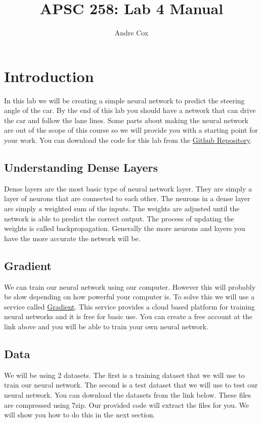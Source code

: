 \documentclass[11pt]{report}
\title{APSC 258: Lab 4 Manual}
\author{Andre Cox}
\begin{document}
\maketitle
\tableofcontents

\clearpage

\chapter{Introduction}
In this lab we will be creating a simple neural network to predict the steering angle of the car.
By the end of this lab you should have a network that can drive the car and follow the lane lines. Some parts about making the neural network are out of the scope of this course so we will provide you with a starting point for your work. You can download the code for this lab from the  
\href{https://github.com/PiCarV/Demos}{Github Repository}.

\section{Understanding Dense Layers}
Dense layers are the most basic type of neural network layer. They are simply a layer of neurons that are connected to each other. The neurons in a dense layer are simply a weighted sum of the inputs. The weights are adjusted until the network is able to predict the correct output. The process of updating the weights is called backpropagation. Generally the more neurons and layers you have the more accurate the network will be. 

\section{Gradient}
We can train our neural network using our computer. However this will probably be slow depending on how powerful your computer is. To solve this we will use a service called \href{https://www.gradient.run/}{Gradient}. This service provides a cloud based platform for training neural networks and it is free for basic use. You can create a free account at the link above and you will be able to train your own neural network.

\section{Data}
We will be using 2 datasets. The first is a training dataset that we will use to train our neural network. The second is a test dataset that we will use to test our neural network. You can download the datasets from the link below. These files are compressed using 7zip. Our provided code will extract the files for you. We will show you how to do this in the next section.
\end{document}
